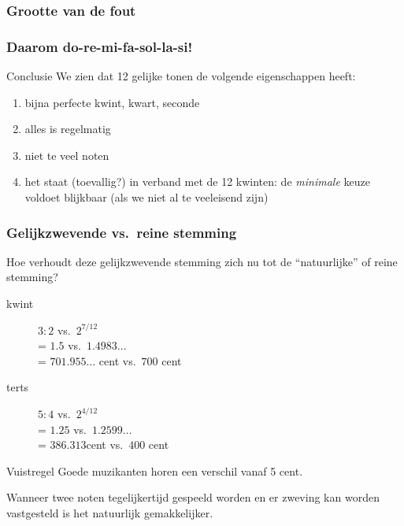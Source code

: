 \documentclass[compress, darktitle, framenumber, totalframenumber, handout]{beamer}
\begin{document}
\begin{frame}
  \frametitle{Grootte van de fout}

  \begin{center}
  \end{center}
\end{frame}

\begin{frame}
  \frametitle{Daarom do-re-mi-fa-sol-la-si!}

  \begin{block}{Conclusie}
    We zien dat \alert{12 gelijke tonen} de volgende eigenschappen heeft:
    \begin{enumerate}
      \item bijna perfecte kwint, kwart, seconde
      \item alles is regelmatig
      \item niet te veel noten
      \item het staat (toevallig?) in verband met de 12 kwinten: de \emph{minimale} keuze voldoet blijkbaar (als we niet al te veeleisend zijn)
    \end{enumerate}
  \end{block}
\end{frame}

\begin{frame}
  \frametitle{Gelijkzwevende vs.\ reine stemming}

  Hoe verhoudt deze gelijkzwevende stemming zich nu tot de ``natuurlijke'' of reine stemming?
  \pause
  \begin{description}
    \item[kwint] $3:2$ vs.\ $2^{7/12}$ \\
      \pause= $1.5$ vs.\ $1.4983\dotso$ \\
      \pause= $701.955\dotso$ cent vs.\ $700$ cent
    \item[terts] $5:4$ vs.\ $2^{4/12}$ \\
      \pause= $1.25$ vs.\ $1.2599\dotso$ \\
      \pause= $386.313$\dotso cent vs.\ $400$ cent
  \end{description}
  \begin{block}{Vuistregel}
    Goede muzikanten horen een verschil vanaf 5 cent.
  \end{block}
  Wanneer twee noten tegelijkertijd gespeeld worden en er zweving kan worden vastgesteld is het natuurlijk gemakkelijker.
\end{frame}
\end{document}
